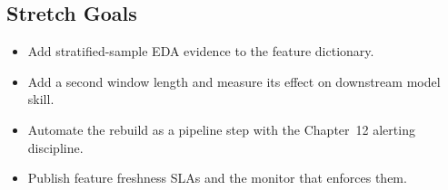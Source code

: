 \subsection*{Stretch Goals}
\begin{itemize}
    \item Add stratified-sample EDA evidence to the feature dictionary.
    \item Add a second window length and measure its effect on downstream model skill.
    \item Automate the rebuild as a pipeline step with the Chapter~12 alerting discipline.
    \item Publish feature freshness SLAs and the monitor that enforces them.
\end{itemize}
